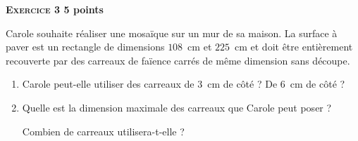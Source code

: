 \textbf{\textsc{Exercice 3} \hfill 5 points}

\medskip

Carole souhaite réaliser une mosaïque sur un mur de sa maison. La surface à paver est un
rectangle de dimensions $108$~cm et $225$~cm et doit être entièrement recouverte par des carreaux
de faïence carrés de même dimension sans découpe.

\medskip

\begin{enumerate}
\item Carole peut-elle utiliser des carreaux de 3~cm de côté ? De 6~cm de côté ?
\item Quelle est la dimension maximale des carreaux que Carole peut poser ?

Combien de carreaux utilisera-t-elle ?
\end{enumerate}

\vspace{0,5cm}

